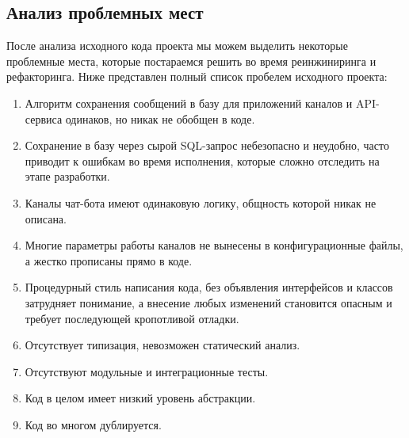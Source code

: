    \subsection{Анализ проблемных мест}
    После анализа исходного кода проекта мы можем выделить некоторые проблемные места, которые постараемся решить во время
    реинжиниринга и рефакторинга. Ниже представлен полный список пробелем исходного проекта:
    \begin{enumerate}
        \item Алгоритм сохранения сообщений в базу для приложений каналов и API-сервиса одинаков, но никак не обобщен в коде.
        \item Сохранение в базу через сырой SQL-запрос небезопасно и неудобно, часто приводит
        к ошибкам во время исполнения, которые сложно отследить на этапе разработки.
        \item Каналы чат-бота имеют одинаковую логику, общность которой никак не описана. 
        \item Многие параметры работы каналов не вынесены в конфигурационные файлы, а жестко прописаны прямо в коде.
        \item Процедурный стиль написания кода, без объявления интерфейсов и классов затрудняет понимание,
        а внесение любых изменений становится опасным и требует последующей кропотливой отладки.
        \item Отсутствует типизация, невозможен статический анализ.
        \item Отсутствуют модульные и интеграционные тесты.
        \item Код в целом имеет низкий уровень абстракции.
        \item Код во многом дублируется.
    \end{enumerate}


